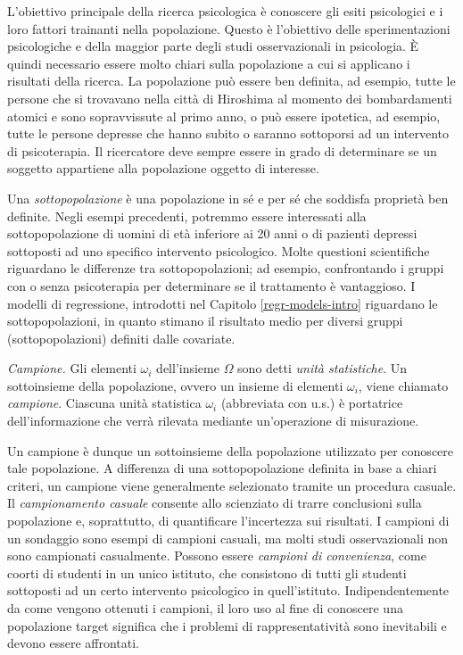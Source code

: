 \documentclass[
  11pt,
]{krantz}
\theoremstyle{definition}
\theoremstyle{definition}
\theoremstyle{definition}
\theoremstyle{definition}
\theoremstyle{remark}
\begin{document}
L'obiettivo principale della ricerca psicologica è conoscere gli esiti psicologici e i loro fattori trainanti nella popolazione. Questo è l'obiettivo delle sperimentazioni psicologiche e della maggior parte degli studi osservazionali in psicologia. È quindi necessario essere molto chiari sulla popolazione a cui si applicano i risultati della ricerca. La popolazione può essere ben definita, ad esempio, tutte le persone che si trovavano nella città di Hiroshima al momento dei bombardamenti atomici e sono sopravvissute al primo anno, o può essere ipotetica, ad esempio, tutte le persone depresse che hanno subito o saranno sottoporsi ad un intervento di psicoterapia. Il ricercatore deve sempre essere in grado di determinare se un soggetto appartiene alla popolazione oggetto di interesse.

Una \emph{sottopopolazione} è una popolazione in sé e per sé che soddisfa proprietà ben definite. Negli esempi precedenti, potremmo essere interessati alla sottopopolazione di uomini di età inferiore ai 20 anni o di pazienti depressi sottoposti ad uno specifico intervento psicologico. Molte questioni scientifiche riguardano le differenze tra sottopopolazioni; ad esempio, confrontando i gruppi con o senza psicoterapia per determinare se il trattamento è vantaggioso. I modelli di regressione, introdotti nel Capitolo \ref{regr-models-intro} riguardano le sottopopolazioni, in quanto stimano il risultato medio per diversi gruppi (sottopopolazioni) definiti dalle covariate.

\emph{Campione.} Gli elementi \(\omega_i\) dell'insieme \(\Omega\) sono detti \emph{unità statistiche}. Un sottoinsieme della popolazione, ovvero un insieme di elementi \(\omega_i\), viene chiamato \emph{campione}. Ciascuna unità statistica \(\omega_i\) (abbreviata con u.s.) è portatrice dell'informazione che verrà rilevata mediante un'operazione di misurazione.

Un campione è dunque un sottoinsieme della popolazione utilizzato per conoscere tale popolazione. A differenza di una sottopopolazione definita in base a chiari criteri, un campione viene generalmente selezionato tramite un procedura casuale. Il \emph{campionamento casuale} consente allo scienziato di trarre conclusioni sulla popolazione e, soprattutto, di quantificare l'incertezza sui risultati. I campioni di un sondaggio sono esempi di campioni casuali, ma molti studi osservazionali non sono campionati casualmente. Possono essere \emph{campioni di convenienza}, come coorti di studenti in un unico istituto, che consistono di tutti gli studenti sottoposti ad un certo intervento psicologico in quell'istituto. Indipendentemente da come vengono ottenuti i campioni, il loro uso al fine di conoscere una popolazione target significa che i problemi di rappresentatività sono inevitabili e devono essere affrontati.
\end{document}
